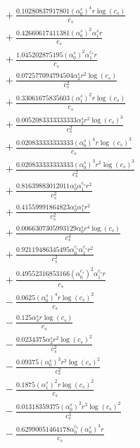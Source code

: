 \documentclass[10pt]{article}
\begin{document}
\begin{align*}
&{}  + \frac{0.10280837917801 \left(\alpha_{0}^s\right)^{4} r \log{\left(c_{s} \right)}}{c_{s}} \\
&{}  + \frac{0.42660617411381 \left(\alpha_{0}^s\right)^{2} \alpha_{1}^s r}{c_{s}} \\
&{}  + \frac{1.045202875195 \left(\alpha_{0}^s\right)^{2} \alpha_{1}^{c_s} r}{c_{s}} \\
&{}  + \frac{0.072577094794504 \alpha_{2}^s r^{2} \log{\left(c_{s} \right)}}{c_{s}^{2}} \\
&{}  + \frac{0.33061675835603 \left(\alpha_{1}^s\right)^{2} r \log{\left(c_{s} \right)}}{c_{s}} \\
&{}  + \frac{0.0052083333333333 \alpha_{2}^s r^{2} \log{\left(c_{s} \right)}^{3}}{c_{s}^{2}} \\
&{}  + \frac{0.020833333333333 \left(\alpha_{0}^s\right)^{4} r \log{\left(c_{s} \right)}^{3}}{c_{s}} \\
&{}  + \frac{0.020833333333333 \left(\alpha_{0}^s\right)^{3} r^{2} \log{\left(c_{s} \right)}^{3}}{c_{s}^{2}} \\
&{}  + \frac{0.81639883012011 \alpha_{0}^s \alpha_{1}^{c_s} r^{2}}{c_{s}^{2}} \\
&{}  + \frac{0.41559991864823 \alpha_{0}^s \alpha_{1}^s r^{2}}{c_{s}^{2}} \\
&{}  + \frac{0.0066307305993129 \alpha_{0}^s r^{4} \log{\left(c_{s} \right)}}{c_{s}^{4}} \\
&{}  + \frac{0.92119486345495 \alpha_{0}^{c_s} \alpha_{1}^{c_s} r^{2}}{c_{s}^{2}} \\
&{}  + \frac{0.49552316853166 \left(\alpha_{0}^{c_s}\right)^{2} \alpha_{1}^{c_s} r}{c_{s}} \\
&{}  - \frac{0.0625 \left(\alpha_{0}^s\right)^{4} r \log{\left(c_{s} \right)}^{2}}{c_{s}} \\
&{}  - \frac{0.125 \alpha_{3}^s r \log{\left(c_{s} \right)}}{c_{s}} \\
&{}  - \frac{0.0234375 \alpha_{2}^s r^{2} \log{\left(c_{s} \right)}^{2}}{c_{s}^{2}} \\
&{}  - \frac{0.09375 \left(\alpha_{0}^s\right)^{3} r^{2} \log{\left(c_{s} \right)}^{2}}{c_{s}^{2}} \\
&{}  - \frac{0.1875 \left(\alpha_{1}^s\right)^{2} r \log{\left(c_{s} \right)}^{2}}{c_{s}} \\
&{}  - \frac{0.01318359375 \left(\alpha_{0}^s\right)^{2} r^{3} \log{\left(c_{s} \right)}^{2}}{c_{s}^{3}} \\
&{}  - \frac{0.62990051464178 \alpha_{0}^{c_s} \left(\alpha_{0}^s\right)^{3} r}{c_{s}} \\

\end{align*}
\end{document}
